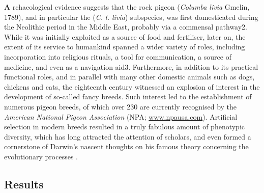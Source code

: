 \documentclass[a4paper]{article}
\begin{document}
\newpage


\begin{multicols}{2}
\lettrine[findent=2pt]{\textbf{A}}{ }rchaeological evidence suggests that the rock pigeon (\textit{Columba livia} Gmelin, 1789), and in particular the (\textit{C. l. livia}) subspecies, was first domesticated during the Neolithic period in the Middle East, probably via a commensal pathway2. While it was initially exploited as a source of food and fertiliser, later on, the extent of its service to humankind spanned a wider variety of roles, including incorporation into religious rituals, a tool for communication, a source of medicine, and even as a navigation aid3. Furthermore, in addition to its practical functional roles, and in parallel with many other domestic animals such as dogs, chickens and cats, the eighteenth century witnessed an explosion of interest in the development of so-called fancy breeds. Such interest led to the establishment of numerous pigeon breeds, of which over 230 are currently recognised by the \textit{American National Pigeon Association} (NPA; \url{www.npausa.com}). Artificial selection in modern breeds resulted in a truly fabulous amount of phenotypic diversity, which has long attracted the attention of scholars, and even formed a cornerstone of Darwin’s nascent thoughts on his famous theory concerning the evolutionary processes \cite{pacheco_darwins_2020}.\
\end{multicols}



\subsection*{Results}

\end{document}
